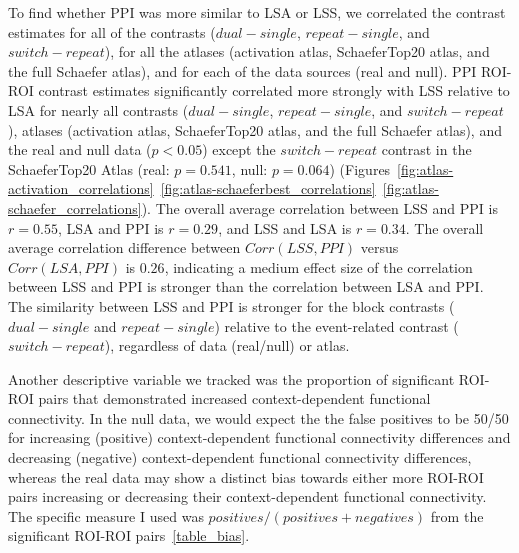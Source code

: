 \documentclass[phd,appendix,figures]{uithesis}
\begin{document}
To find whether PPI was more similar to LSA or LSS, we correlated the contrast estimates for all of the contrasts
($dual - single$, $repeat - single$, and $switch - repeat$),
for all the atlases (activation atlas, SchaeferTop20 atlas, and the full Schaefer atlas), and
for each of the data sources (real and null).
PPI ROI-ROI contrast estimates significantly correlated more strongly with LSS relative to LSA
for nearly all contrasts ($dual - single$, $repeat - single$, and $switch - repeat$),
atlases (activation atlas, SchaeferTop20 atlas, and the full Schaefer atlas),
and the real and null data ($p < 0.05$) except the $switch - repeat$
contrast in the SchaeferTop20 Atlas (real: $p = 0.541$, null: $p = 0.064$)
(Figures~\ref{fig:atlas-activation_correlations}~\ref{fig:atlas-schaeferbest_correlations}~\ref{fig:atlas-schaefer_correlations}).
The overall average correlation between LSS and PPI is $r = 0.55$, LSA and PPI is $r = 0.29$,
and LSS and LSA is $r = 0.34$.
The overall average correlation difference between $Corr(LSS, PPI)$ versus $Corr(LSA, PPI)$ is $0.26$,
indicating a medium effect size of the correlation between LSS and PPI is stronger than the
correlation between LSA and PPI.
The similarity between LSS and PPI is stronger for the block contrasts ($dual - single$ and $repeat - single$)
relative to the event-related contrast ($switch - repeat$), regardless of data (real/null) or atlas.

Another descriptive variable we tracked was the proportion of significant ROI-ROI pairs
that demonstrated increased context-dependent functional connectivity.
In the null data, we would expect the the false positives to be 50/50 for
increasing (positive) context-dependent functional connectivity differences
and decreasing (negative) context-dependent functional connectivity differences,
whereas the real data may show a distinct bias towards either more ROI-ROI pairs
increasing or decreasing their context-dependent functional connectivity.
The specific measure I used was $positives / (positives + negatives)$ from the significant ROI-ROI pairs~\ref{table_bias}.
\end{document}
